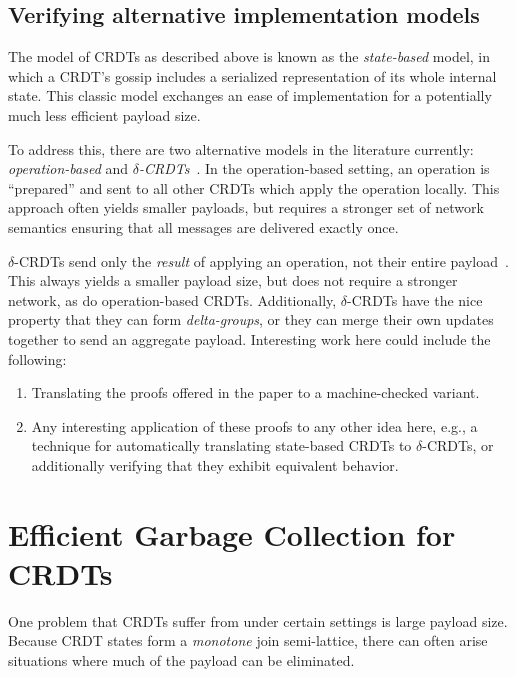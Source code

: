 \documentclass{article}
\begin{document}
  \subsection{Verifying alternative implementation models}
  The model of CRDTs as described above is known as the \textit{state-based}
  model, in which a CRDT's gossip includes a serialized representation of its
  whole internal state. This classic model exchanges an ease of implementation
  for a potentially much less efficient payload size.

  To address this, there are two alternative models in the literature
  currently: \textit{operation-based} and
  \textit{$\delta$-CRDTs}~\cite{shapiro11,almeida18}. In the operation-based
  setting, an operation is ``prepared'' and sent to all other CRDTs which apply
  the operation locally. This approach often yields smaller payloads, but
  requires a stronger set of network semantics ensuring that all messages are
  delivered exactly once.

  $\delta$-CRDTs send only the \textit{result} of applying an operation, not
  their entire payload~\cite{almeida18}. This always yields a smaller payload
  size, but does not require a stronger network, as do operation-based CRDTs.
  Additionally, $\delta$-CRDTs have the nice property that they can form
  \textit{delta-groups}, or they can merge their own updates together to send
  an aggregate payload. Interesting work here could include the following:
  \begin{enumerate}
    \item Translating the proofs offered in the paper to a machine-checked
      variant.
    \item Any interesting application of these proofs to any other idea here,
      e.g., a technique for automatically translating state-based CRDTs to
      $\delta$-CRDTs, or additionally verifying that they exhibit equivalent
      behavior\footnotemark.
  \end{enumerate}


  \section{Efficient Garbage Collection for CRDTs}
  One problem that CRDTs suffer from under certain settings is large payload
  size. Because CRDT states form a \textit{monotone} join semi-lattice, there
  can often arise situations where much of the payload can be eliminated.
\end{document}
